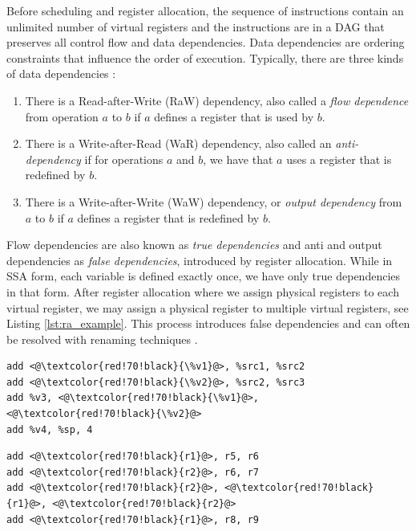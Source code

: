 Before scheduling and register allocation, the sequence of instructions contain an unlimited number of virtual registers and the instructions are in a DAG that preserves all control flow and data dependencies. Data dependencies are ordering constraints that influence the order of execution. Typically, there are three kinds of data dependencies \cite{data_dependece}:
\begin{enumerate}
\item There is a Read-after-Write (RaW) dependency, also called a \emph{flow dependence} from operation $a$ to $b$ if $a$ defines a register that is used by $b$.
\item  There is a Write-after-Read (WaR) dependency, also called an \emph{anti-dependency} if for operations $a$ and $b$, we have that $a$ uses a register that is redefined by $b$. 
\item There is a Write-after-Write (WaW) dependency, or \emph{output dependency} from $a$ to $b$ if $a$ defines a register that is redefined by $b$.
\end{enumerate} 
Flow dependencies are also known as \emph{true dependencies} and anti and output dependencies as \emph{false dependencies}, introduced by register allocation. While in SSA form, each variable is defined exactly once, we have only true dependencies in that form. After register allocation where we assign physical registers to each virtual register, we may assign a physical register to multiple virtual registers, see Listing \ref{lst:ra_example}. This process introduces false dependencies and can often be resolved with renaming techniques \cite{renaming}. 

\lstset{style=customasm}
\begin{center}
\hspace{2px}\begin{minipage}[t]{.475\textwidth}
\begin{lstlisting}[frame=tlrb]
add <@\textcolor{red!70!black}{\%v1}@>, %src1, %src2
add <@\textcolor{red!70!black}{\%v2}@>, %src2, %src3
add %v3, <@\textcolor{red!70!black}{\%v1}@>, <@\textcolor{red!70!black}{\%v2}@>
add %v4, %sp, 4
\end{lstlisting}
\end{minipage}\hfill
\begin{minipage}[t]{.475\textwidth}
\begin{lstlisting}[frame=tlrb]
add <@\textcolor{red!70!black}{r1}@>, r5, r6
add <@\textcolor{red!70!black}{r2}@>, r6, r7
add <@\textcolor{red!70!black}{r2}@>, <@\textcolor{red!70!black}{r1}@>, <@\textcolor{red!70!black}{r2}@>
add <@\textcolor{red!70!black}{r1}@>, r8, r9
\end{lstlisting}
\end{minipage}
\label{lst:ra_example}
\end{center}

